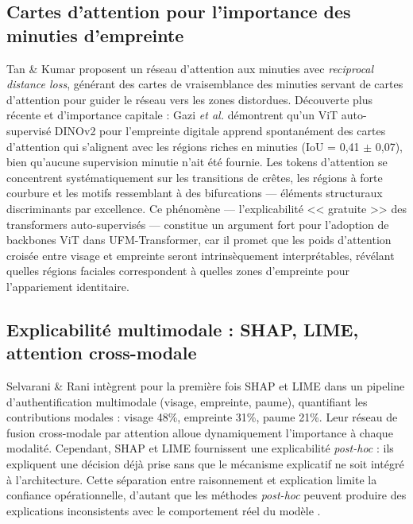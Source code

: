 \documentclass[12pt,a4paper]{report}
\begin{document}
\subsection{Cartes d'attention pour l'importance des minuties d'empreinte}

Tan \& Kumar \cite{tan2021minutiae} proposent un r\'{e}seau d'attention aux minuties avec \textit{reciprocal distance loss}, g\'{e}n\'{e}rant des cartes de vraisemblance des minuties servant de cartes d'attention pour guider le r\'{e}seau vers les zones distordues. D\'{e}couverte plus r\'{e}cente et d'importance capitale : Gazi \textit{et al.} \cite{gazi2026minutiae} d\'{e}montrent qu'un ViT auto-supervis\'{e} DINOv2 pour l'empreinte digitale apprend spontan\'{e}ment des cartes d'attention qui s'alignent avec les r\'{e}gions riches en minuties (IoU = 0,41 $\pm$ 0,07), bien qu'aucune supervision minutie n'ait \'{e}t\'{e} fournie. Les tokens d'attention se concentrent syst\'{e}matiquement sur les transitions de cr\^{e}tes, les r\'{e}gions \`{a} forte courbure et les motifs ressemblant \`{a} des bifurcations --- \'{e}l\'{e}ments structuraux discriminants par excellence. Ce ph\'{e}nom\`{e}ne --- l'explicabilit\'{e} << gratuite >> des transformers auto-supervis\'{e}s --- constitue un argument fort pour l'adoption de backbones ViT dans UFM-Transformer, car il promet que les poids d'attention crois\'{e}e entre visage et empreinte seront intrins\`{e}quement interpr\'{e}tables, r\'{e}v\'{e}lant quelles r\'{e}gions faciales correspondent \`{a} quelles zones d'empreinte pour l'appariement identitaire.

\subsection{Explicabilit\'{e} multimodale : SHAP, LIME, attention cross-modale}

Selvarani \& Rani \cite{selvarani2025explainability} int\`{e}grent pour la premi\`{e}re fois SHAP et LIME dans un pipeline d'authentification multimodale (visage, empreinte, paume), quantifiant les contributions modales : visage 48\%, empreinte 31\%, paume 21\%. Leur r\'{e}seau de fusion cross-modale par attention alloue dynamiquement l'importance \`{a} chaque modalit\'{e}. Cependant, SHAP et LIME fournissent une explicabilit\'{e} \textit{post-hoc} : ils expliquent une d\'{e}cision d\'{e}j\`{a} prise sans que le m\'{e}canisme explicatif ne soit int\'{e}gr\'{e} \`{a} l'architecture. Cette s\'{e}paration entre raisonnement et explication limite la confiance op\'{e}rationnelle, d'autant que les m\'{e}thodes \textit{post-hoc} peuvent produire des explications inconsistents avec le comportement r\'{e}el du mod\`{e}le \cite{neto2022explainable}.
\end{document}
